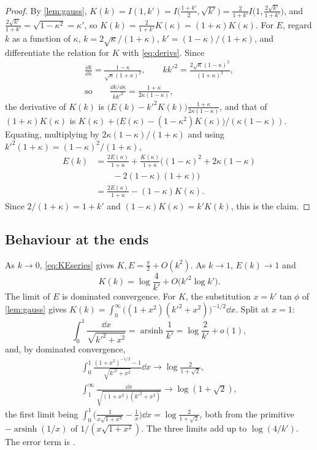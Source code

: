 \begin{proof}
By \cref{lem:gauss}, $K(k)=I(1,k')=I\big(\frac{1+k'}2,\sqrt{k'}\big)
=\frac2{1+k'}I\big(1,\frac{2\sqrt{k'}}{1+k'}\big)$, and
$\frac{2\sqrt{k'}}{1+k'}=\sqrt{1-\kappa^2}=\kappa'$, so
$K(k)=\frac2{1+k'}K(\kappa)=(1+\kappa)K(\kappa)$. For $E$, regard $k$ as a
function of $\kappa$, $k=2\sqrt\kappa/(1+\kappa)$, $k'=(1-\kappa)/(1+\kappa)$,
and differentiate the relation for $K$ with \eqref{eq:derivs}. Since
\begin{gather*}
\frac{\dd k}{\dd\kappa}=\frac{1-\kappa}{\sqrt\kappa(1+\kappa)^2},\qquad
kk'^2=\frac{2\sqrt\kappa(1-\kappa)^2}{(1+\kappa)^3},\\
\text{so}\qquad
\frac{\dd k/\dd\kappa}{kk'^2}=\frac{1+\kappa}{2\kappa(1-\kappa)},
\end{gather*}
the derivative of $K(k)$ is $\big(E(k)-k'^2K(k)\big)\frac{1+\kappa}{2\kappa(1-\kappa)}$,
and that of $(1+\kappa)K(\kappa)$ is
$K(\kappa)+\big(E(\kappa)-(1-\kappa^2)K(\kappa)\big)/(\kappa(1-\kappa))$.
Equating, multiplying by $2\kappa(1-\kappa)/(1+\kappa)$ and using
$k'^2(1+\kappa)=(1-\kappa)^2/(1+\kappa)$,
\begin{align*}
E(k)&=\frac{2E(\kappa)}{1+\kappa}+\frac{K(\kappa)}{1+\kappa}\Big((1-\kappa)^2
+2\kappa(1-\kappa)\\
&\qquad-2(1-\kappa)(1+\kappa)\Big)\\
&=\frac{2E(\kappa)}{1+\kappa}-(1-\kappa)K(\kappa).
\end{align*}
Since $2/(1+\kappa)=1+k'$ and $(1-\kappa)K(\kappa)=k'K(k)$, this is the
claim.
\end{proof}

\subsection{Behaviour at the ends}

As $k\to0$, \eqref{eq:KEseries} gives $K,E=\frac\pi2+O(k^2)$. As $k\to1$,
$E(k)\to1$ and
\begin{equation}\label{eq:Klog}
K(k)=\log\frac4{k'}+O\big(k'^2\log k'\big).
\end{equation}
The limit of $E$ is dominated convergence. For $K$, the substitution
$x=k'\tan\phi$ of \cref{lem:gauss} gives
$K(k)=\int_0^\infty\big((1+x^2)(k'^2+x^2)\big)^{-1/2}\dd x$. Split at $x=1$:
\[
\int_0^1\frac{\dd x}{\sqrt{k'^2+x^2}}=\operatorname{arsinh}\frac1{k'}
=\log\frac2{k'}+o(1),
\]
and, by dominated convergence,
\begin{gather*}
\int_0^1\frac{(1+x^2)^{-1/2}-1}{\sqrt{k'^2+x^2}}\dd x\to\log\frac2{1+\sqrt2},\\
\int_1^\infty\frac{\dd x}{\sqrt{(1+x^2)(k'^2+x^2)}}\to\log(1+\sqrt2),
\end{gather*}
the first limit being
$\int_0^1\big(\frac1{x\sqrt{1+x^2}}-\frac1x\big)\dd x=\log\frac2{1+\sqrt2}$,
both from the primitive $-\operatorname{arsinh}(1/x)$ of
$1/(x\sqrt{1+x^2})$. The three limits add up to $\log(4/k')$.
The error term is \cite[19.12.1]{dlmf}.

